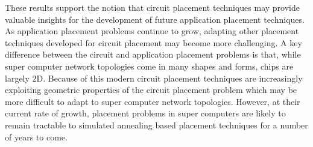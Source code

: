 		These results support the notion that circuit placement techniques may
		provide valuable insights for the development of future application
		placement techniques. As application placement problems continue to grow,
		adapting other placement techniques developed for circuit placement may
		become more challenging. A key difference between the circuit and
		application placement problems is that, while super computer network
		topologies come in many shapes and forms, chips are largely 2D.  Because of
		this modern circuit placement techniques are increasingly exploiting
		geometric properties of the circuit placement problem which may be more
		difficult to adapt to super computer network topologies.  However, at their
		current rate of growth, placement problems in super computers are likely to
		remain tractable to simulated annealing based placement techniques for a
		number of years to come. 

